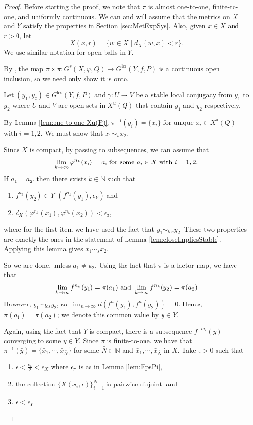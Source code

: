 \documentclass{amsart}
\newcommand{\N}{\mathbb{N}}
\newcommand{\lcs}{\text{lcs}}
\theoremstyle{plain}
\theoremstyle{definition}
\theoremstyle{remark}
\begin{document}
\begin{proof}
Before starting the proof, we note that $\pi$ is almost one-to-one, finite-to-one, and uniformly continuous. We can and will assume that the metrics on $X$ and $Y$ satisfy the properties in Section \ref{sec:MetExpSys}. Also, given $x\in X$ and $r>0$, let
\[ X(x, r)=\{ w\in X \mid d_X(w,x)<r \}.
\]
We use similar notation for open balls in $Y$.

By \cite[Lemma 6,8]{DeeSto}, the map $\pi \times \pi:  G^s(X, \varphi, Q) \rightarrow G^\lcs(Y, f, P)$ is a continuous open inclusion, so we need only show it is onto. 

Let $(y_1, y_2) \in G^\lcs(Y, f, P)$ and $\gamma: U \rightarrow V$ be a stable local conjugacy from $y_1$ to $y_2$ where $U$ and $V$ are open sets in $X^u(Q)$ that contain $y_1$ and $y_2$ respectively.

By Lemma \ref{lem:one-to-one-Xu(P)}, $\pi^{-1}(y_i)=\{ x_i \}$ for unique $x_i \in X^u(Q)$ with $i=1, 2$. We must show that $x_1 \sim_s x_2$. 

Since $X$ is compact, by passing to subsequences, we can assume that 
\[ \lim_{k\rightarrow \infty}\varphi^{n_k}(x_i)=a_i \hbox{ for some }a_i \in X \hbox{ with }i=1, 2.\] 
If $a_1=a_2$, then there exists $k \in \N$ such that
\begin{enumerate}
\item $f^{n_k}(y_2) \in Y^s(f^{n_k}(y_1), \epsilon_Y)$ and
\item $d_X(\varphi^{n_k}(x_1), \varphi^{n_k}(x_2)) < \epsilon_{\pi}$,
\end{enumerate}
where for the first item we have used the fact that $y_1 \sim_{lcs} y_2$. These two properties are exactly the ones in the statement of Lemma \ref{lem:closeImpliesStable}. Applying this lemma gives $x_1 \sim_s x_2$. 

So we are done, unless $a_1 \neq a_2$. Using the fact that $\pi$ is a factor map, we have that 
\[
\lim_{k\rightarrow \infty}f^{n_k}(y_1)=\pi(a_1) \hbox{ and }\lim_{k\rightarrow \infty}f^{n_k}(y_2)=\pi(a_2)
\]
However, $y_1 \sim_{lcs} y_2$, so $\lim_{n\rightarrow \infty} d(f^n(y_1), f^n(y_2)) =0$. Hence, $\pi(a_1)=\pi(a_2)$; we denote this common value by $y\in Y$. 

Again, using the fact that $Y$ is compact, there is a subsequence $f^{-m_l}(y)$ converging to some $\bar{y}\in Y$. Since $\pi$ is finite-to-one, we have that $\pi^{-1}(\bar{y})=\{ \bar{x}_1, \cdots, \bar{x}_{\bar{N}} \}$ for some $\bar{N}\in \N$ and $\bar{x}_1, \cdots, \bar{x}_{\bar{N}}$ in $X$. Take $\epsilon>0$ such that 
\begin{enumerate}
\item $\epsilon<\frac{\epsilon_{\pi}}{2}<\epsilon_X$ where $\epsilon_{\pi}$ is as in Lemma \ref{lem:EpsPi},
\item the collection $\{ X(\bar{x}_i, \epsilon)  \}_{i=1}^{\bar{N}}$ is pairwise disjoint, and
\item $\epsilon< \epsilon_Y$
\end{enumerate}


\end{proof}
\end{document}
